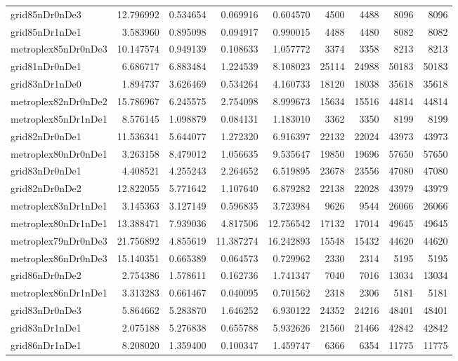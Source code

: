 \begin{longtable}{|l|r|r|r|r|r|r|r|r|}
grid85nDr0nDe3 & 12.796992 & 0.534654 & 0.069916 & 0.604570 & 4500 & 4488 & 8096 & 8096 \\
grid85nDr1nDe1 & 3.583960 & 0.895098 & 0.094917 & 0.990015 & 4488 & 4480 & 8082 & 8082 \\
metroplex85nDr0nDe3 & 10.147574 & 0.949139 & 0.108633 & 1.057772 & 3374 & 3358 & 8213 & 8213 \\
grid81nDr0nDe1 & 6.686717 & 6.883484 & 1.224539 & 8.108023 & 25114 & 24988 & 50183 & 50183 \\
grid83nDr1nDe0 & 1.894737 & 3.626469 & 0.534264 & 4.160733 & 18120 & 18038 & 35618 & 35618 \\
metroplex82nDr0nDe2 & 15.786967 & 6.245575 & 2.754098 & 8.999673 & 15634 & 15516 & 44814 & 44814 \\
metroplex85nDr1nDe1 & 8.576145 & 1.098879 & 0.084131 & 1.183010 & 3362 & 3350 & 8199 & 8199 \\
grid82nDr0nDe1 & 11.536341 & 5.644077 & 1.272320 & 6.916397 & 22132 & 22024 & 43973 & 43973 \\
metroplex80nDr0nDe1 & 3.263158 & 8.479012 & 1.056635 & 9.535647 & 19850 & 19696 & 57650 & 57650 \\
grid83nDr0nDe1 & 4.408521 & 4.255243 & 2.264652 & 6.519895 & 23678 & 23556 & 47080 & 47080 \\
grid82nDr0nDe2 & 12.822055 & 5.771642 & 1.107640 & 6.879282 & 22138 & 22028 & 43979 & 43979 \\
metroplex83nDr1nDe1 & 3.145363 & 3.127149 & 0.596835 & 3.723984 & 9626 & 9544 & 26066 & 26066 \\
metroplex80nDr1nDe1 & 13.388471 & 7.939036 & 4.817506 & 12.756542 & 17132 & 17014 & 49645 & 49645 \\
metroplex79nDr0nDe3 & 21.756892 & 4.855619 & 11.387274 & 16.242893 & 15548 & 15432 & 44620 & 44620 \\
metroplex86nDr0nDe3 & 15.140351 & 0.665389 & 0.064573 & 0.729962 & 2330 & 2314 & 5195 & 5195 \\
grid86nDr0nDe2 & 2.754386 & 1.578611 & 0.162736 & 1.741347 & 7040 & 7016 & 13034 & 13034 \\
metroplex86nDr1nDe1 & 3.313283 & 0.661467 & 0.040095 & 0.701562 & 2318 & 2306 & 5181 & 5181 \\
grid83nDr0nDe3 & 5.864662 & 5.283870 & 1.646252 & 6.930122 & 24352 & 24216 & 48401 & 48401 \\
grid83nDr1nDe1 & 2.075188 & 5.276838 & 0.655788 & 5.932626 & 21560 & 21466 & 42842 & 42842 \\
grid86nDr1nDe1 & 8.208020 & 1.359400 & 0.100347 & 1.459747 & 6366 & 6354 & 11775 & 11775 \\

\end{longtable}

